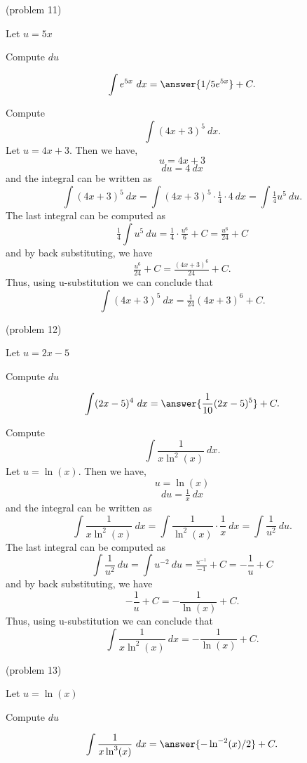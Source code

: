 \documentclass{ximera}
\begin{document}
\begin{problem}(problem 11)
\begin{hint}
Let $u = 5x$
\end{hint}
\begin{hint}
Compute $du$
\end{hint}
\[\int e^{5x} \ dx = \answer{1/5 e^{5x}} +C.\]
\end{problem}


\begin{example}[example 12] Compute 
\[\int (4x+3)^5 \ dx.\]
Let $u = 4x+3$. Then we have,
\[u = 4x+3\]
\[du = 4 \ dx\]
and the integral can be written as 
\[\int (4x+3)^5 \ dx =   \int (4x+3)^5 \cdot \tfrac14\cdot 4  \   dx =   \int \tfrac14 u^5 \ du.\]
The last integral can be computed as 
\[\tfrac14  \int u^5 \ du = \tfrac14  \cdot \tfrac{u^6}{6} + C = \tfrac{u^6}{24} + C\]
and by back substituting, we have 
\[\tfrac{u^6}{24} + C = \tfrac{(4x+3)^6}{24}+ C.\]
Thus, using u-substitution we can conclude that
\[\int (4x+3)^5 \ dx = \tfrac{1}{24}(4x+3)^6 + C.\]
\end{example}




\begin{problem}(problem 12)
\begin{hint}
Let $u = 2x - 5$
\end{hint}
\begin{hint}
Compute $du$
\end{hint}
\[\int (2x - 5)^4 \ dx = \answer{\frac{1}{10}(2x-5)^5} +C.\]
\end{problem}


\begin{example}[example 13] Compute 
\[\int \frac{1}{x\ln^2(x)} \ dx.\]
Let $u = \ln(x)$. Then we have,
\[u = \ln(x)\]
\[du = \tfrac1x \ dx\]
and the integral can be written as 
\[\int \frac{1}{x\ln^2(x)} \ dx = \int \frac{1}{\ln^2(x)} \cdot \frac{1}{x}\  dx = \int \frac{1}{u^2} \ du.\]
The last integral can be computed as 
\[\int \frac{1}{u^2} \ du = \int u^{-2} \ du = \tfrac{u^{-1}}{-1} + C 
= -\frac{1}{u} + C\]
and by back substituting, we have 
\[-\frac{1}{u} + C =  -\frac{1}{\ln(x)} + C.\]
Thus, using u-substitution we can conclude that
\[\int \frac{1}{x\ln^2(x)} \ dx =  -\frac{1}{\ln(x)} + C.\]
\end{example}


\begin{problem}(problem 13)
\begin{hint}
Let $u = \ln(x)$
\end{hint}
\begin{hint}
Compute $du$
\end{hint}
\[\int \frac{1}{x\ln^3(x)} \ dx = \answer{- \ln^{-2}(x)/2} +C.\]
\end{problem}
\end{document}
